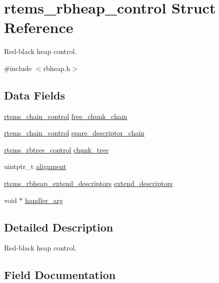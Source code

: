 \hypertarget{structrtems__rbheap__control}{}\section{rtems\+\_\+rbheap\+\_\+control Struct Reference}
\label{structrtems__rbheap__control}


Red-\/black heap control.  




{\ttfamily \#include $<$rbheap.\+h$>$}

\subsection*{Data Fields}
\begin{DoxyCompactItemize}
\item 
\mbox{\hyperlink{unionChain__Control}{rtems\+\_\+chain\+\_\+control}} \mbox{\hyperlink{structrtems__rbheap__control_a64cdd27a044b910a37e6524b597d0622}{free\+\_\+chunk\+\_\+chain}}
\item 
\mbox{\hyperlink{unionChain__Control}{rtems\+\_\+chain\+\_\+control}} \mbox{\hyperlink{structrtems__rbheap__control_a00fc7e68788659d7be52f9c467acfbf3}{spare\+\_\+descriptor\+\_\+chain}}
\item 
\mbox{\hyperlink{group__ClassicRBTrees_ga21fe446d0b3cb8b25c814e93357753ef}{rtems\+\_\+rbtree\+\_\+control}} \mbox{\hyperlink{structrtems__rbheap__control_a9bde26d69cdde1fe6f9455d58b6b1ef3}{chunk\+\_\+tree}}
\item 
uintptr\+\_\+t \mbox{\hyperlink{structrtems__rbheap__control_a6ce146d4d79ec30eae24a7d13bf124ae}{alignment}}
\item 
\mbox{\hyperlink{group__RBHeap_gaa15b8f5425b4d2aa188607bb9941fb20}{rtems\+\_\+rbheap\+\_\+extend\+\_\+descriptors}} \mbox{\hyperlink{structrtems__rbheap__control_a85883a3e5d1acabbbf80dc953dfb4148}{extend\+\_\+descriptors}}
\item 
void $\ast$ \mbox{\hyperlink{structrtems__rbheap__control_ad72b6257df7118611d4d4a0a5379f883}{handler\+\_\+arg}}
\end{DoxyCompactItemize}


\subsection{Detailed Description}
Red-\/black heap control. 

\subsection{Field Documentation}
\mbox{\label{structrtems__rbheap__control_a6ce146d4d79ec30eae24a7d13bf124ae}} 

